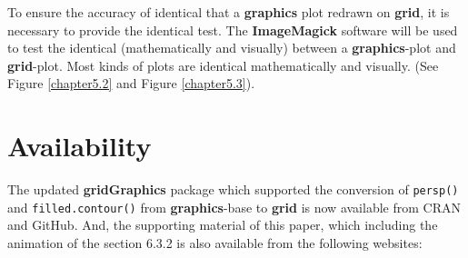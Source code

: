 \documentclass[11pt]{report}
\begin{document}
To ensure the accuracy of identical that a \textbf{graphics} plot redrawn on \textbf{grid}, it is necessary to provide the identical test. The \textbf{ImageMagick} software will be used to test the identical (mathematically and visually) between a \textbf{graphics}-plot and \textbf{grid}-plot. Most kinds of plots are identical mathematically and visually. (See Figure \ref{chapter5.2} and Figure \ref{chapter5.3}).

\section*{Availability}
The updated \textbf{gridGraphics} package which supported the conversion of \texttt{persp()} and \texttt{filled.contour()} from \textbf{graphics}-base to \textbf{grid} is now available from CRAN and GitHub. And, the supporting material of this paper, which including the animation of the section 6.3.2 is also available from the following websites: \\
\begin{center}
     \\
     \\
    \\
\end{center}






\end{document}

